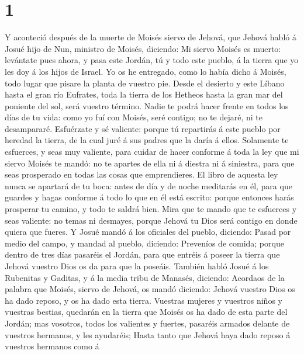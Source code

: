 \hypertarget{section}{%
\section{1}\label{section}}

 Y aconteció después de la muerte de Moisés siervo de
Jehová, que Jehová habló á Josué hijo de Nun, ministro de Moisés,
diciendo:  Mi siervo Moisés es muerto: levántate pues ahora,
y pasa este Jordán, tú y todo este pueblo, á la tierra que yo les doy á
los hijos de Israel.  Yo os he entregado, como lo había
dicho á Moisés, todo lugar que pisare la planta de vuestro pie.
 Desde el desierto y este Líbano hasta el gran río Eufrates,
toda la tierra de los Hetheos hasta la gran mar del poniente del sol,
será vuestro término.  Nadie te podrá hacer frente en todos
los días de tu vida: como yo fuí con Moisés, seré contigo; no te dejaré,
ni te desampararé.  Esfuérzate y sé valiente: porque tú
repartirás á este pueblo por heredad la tierra, de la cual juré á sus
padres que la daría á ellos.  Solamente te esfuerces, y seas
muy valiente, para cuidar de hacer conforme á toda la ley que mi siervo
Moisés te mandó: no te apartes de ella ni á diestra ni á siniestra, para
que seas prosperado en todas las cosas que emprendieres.  El
libro de aquesta ley nunca se apartará de tu boca: antes de día y de
noche meditarás en él, para que guardes y hagas conforme á todo lo que
en él está escrito: porque entonces harás prosperar tu camino, y todo te
saldrá bien.  Mira que te mando que te esfuerces y seas
valiente: no temas ni desmayes, porque Jehová tu Dios será contigo en
donde quiera que fueres.  Y Josué mandó á los oficiales del
pueblo, diciendo:  Pasad por medio del campo, y mandad al
pueblo, diciendo: Preveníos de comida; porque dentro de tres días
pasaréis el Jordán, para que entréis á poseer la tierra que Jehová
vuestro Dios os da para que la poseáis.  También habló
Josué á los Rubenitas y Gaditas, y á la media tribu de Manasés,
diciendo:  Acordaos de la palabra que Moisés, siervo de
Jehová, os mandó diciendo: Jehová vuestro Dios os ha dado reposo, y os
ha dado esta tierra.  Vuestras mujeres y vuestros niños y
vuestras bestias, quedarán en la tierra que Moisés os ha dado de esta
parte del Jordán; mas vosotros, todos los valientes y fuertes, pasaréis
armados delante de vuestros hermanos, y les ayudaréis; 
Hasta tanto que Jehová haya dado reposo á vuestros hermanos como á
